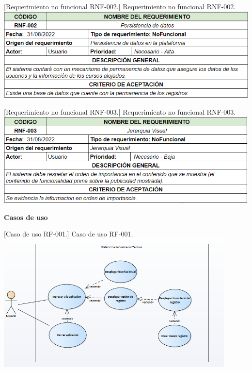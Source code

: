 \begin{enumerate}
        \vspace{2mm}
        \begin{minipage}{0.9\textwidth}
        \centering
        [{Requerimiento no funcional RNF-002.}]{ Requerimiento no funcional RNF-002. }
        \label{reqnf2}
         \includegraphics[width=1\textwidth]{Images/nf2.png}
        \end{minipage}

        \vspace{2mm}
        \begin{minipage}{0.9\textwidth}
        \centering
        [{Requerimiento no funcional RNF-003.}]{ Requerimiento no funcional RNF-003. }
        \label{reqnf3}
         \includegraphics[width=1\textwidth]{Images/nf3.png}
        \end{minipage}
        
\end{enumerate}
\newline
\textbf{Casos de uso}
    
    \vspace{2mm}
    \begin{minipage}{0.9\textwidth}
    \centering
    [{Caso de uso RF-001.}]{ Caso de uso RF-001. }
    \label{caso1}
     \includegraphics[width=0.9\textwidth]{Images/casoUso1.png}
    \end{minipage}
    
